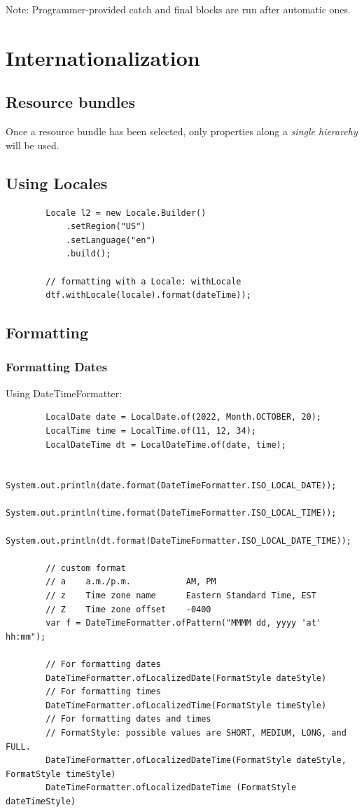 \documentclass{scrartcl}
\begin{document}
    Note: Programmer-provided catch and final blocks are run after automatic ones.

\section{Internationalization}
\subsection{Resource bundles}

    Once a resource bundle has been selected, only properties along a \textit{single hierarchy} will be used.


\subsection{Using Locales}

    \begin{lstlisting}
        Locale l2 = new Locale.Builder()
            .setRegion("US")
            .setLanguage("en")
            .build();

        // formatting with a Locale: withLocale
        dtf.withLocale(locale).format(dateTime));

    \end{lstlisting}

\subsection{Formatting}
\subsubsection{Formatting Dates}

    Using DateTimeFormatter:

    \begin{lstlisting}
        LocalDate date = LocalDate.of(2022, Month.OCTOBER, 20);
        LocalTime time = LocalTime.of(11, 12, 34);
        LocalDateTime dt = LocalDateTime.of(date, time);

        System.out.println(date.format(DateTimeFormatter.ISO_LOCAL_DATE));
        System.out.println(time.format(DateTimeFormatter.ISO_LOCAL_TIME));
        System.out.println(dt.format(DateTimeFormatter.ISO_LOCAL_DATE_TIME));

        // custom format
        // a    a.m./p.m.           AM, PM
        // z	Time zone name	    Eastern Standard Time, EST
        // Z	Time zone offset    -0400
        var f = DateTimeFormatter.ofPattern("MMMM dd, yyyy 'at' hh:mm");

        // For formatting dates
        DateTimeFormatter.ofLocalizedDate(FormatStyle dateStyle)
        // For formatting times
        DateTimeFormatter.ofLocalizedTime(FormatStyle timeStyle)
        // For formatting dates and times
        // FormatStyle: possible values are SHORT, MEDIUM, LONG, and FULL.
        DateTimeFormatter.ofLocalizedDateTime(FormatStyle dateStyle, FormatStyle timeStyle)
        DateTimeFormatter.ofLocalizedDateTime (FormatStyle dateTimeStyle)



    \end{lstlisting}
\end{document}
